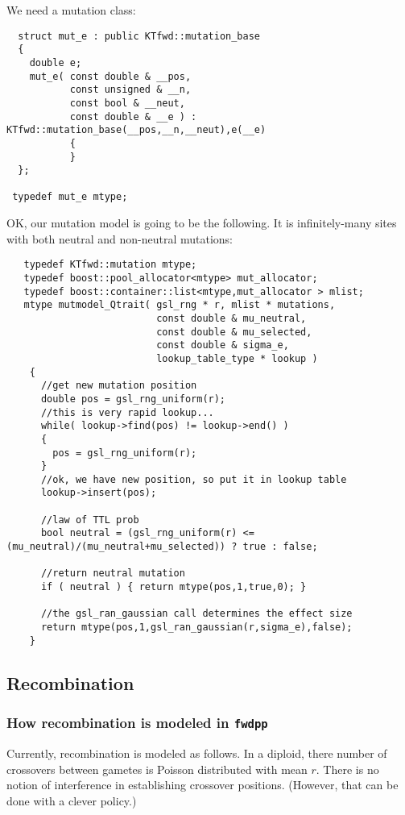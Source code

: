 \documentclass{article}
\begin{document}
We need a mutation class:
\begin{lstlisting}
  struct mut_e : public KTfwd::mutation_base
  {
    double e;
    mut_e( const double & __pos,
           const unsigned & __n,
           const bool & __neut,
           const double & __e ) : KTfwd::mutation_base(__pos,__n,__neut),e(__e)
           {
           }
  };

 typedef mut_e mtype;
\end{lstlisting}

OK, our mutation model is going to be the following.  It is infinitely-many sites with both neutral and non-neutral mutations:
\begin{lstlisting}
   typedef KTfwd::mutation mtype;
   typedef boost::pool_allocator<mtype> mut_allocator;
   typedef boost::container::list<mtype,mut_allocator > mlist;
   mtype mutmodel_Qtrait( gsl_rng * r, mlist * mutations,
                          const double & mu_neutral,
                          const double & mu_selected,
                          const double & sigma_e,
                          lookup_table_type * lookup )
    {
      //get new mutation position
      double pos = gsl_rng_uniform(r);
      //this is very rapid lookup...
      while( lookup->find(pos) != lookup->end() )
      {
        pos = gsl_rng_uniform(r);
      }
      //ok, we have new position, so put it in lookup table
      lookup->insert(pos);

      //law of TTL prob
      bool neutral = (gsl_rng_uniform(r) <= (mu_neutral)/(mu_neutral+mu_selected)) ? true : false;

      //return neutral mutation
      if ( neutral ) { return mtype(pos,1,true,0); }

      //the gsl_ran_gaussian call determines the effect size
      return mtype(pos,1,gsl_ran_gaussian(r,sigma_e),false);
    }
\end{lstlisting}

\subsection{Recombination}
\subsubsection{\label{recmodel}How recombination is modeled in \texttt{fwdpp}}
Currently, recombination is modeled as follows.  In a diploid, there number of crossovers between gametes is Poisson distributed with mean $r$.  There is no notion of interference in establishing crossover positions.  (However, that can be done with a clever policy.)
\end{document}
